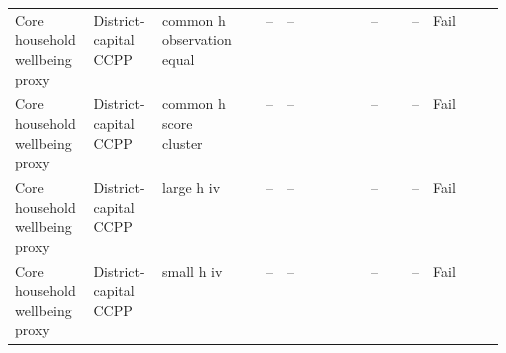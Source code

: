 \begin{longtable}{@{}p{0.16\linewidth}p{0.14\linewidth}p{0.14\linewidth}rp{0.13\linewidth}rrl@{}}
Core household wellbeing proxy & District-capital CCPP & common h observation equal & -- & -- & -- & -- & Fail \\
Core household wellbeing proxy & District-capital CCPP & common h score cluster & -- & -- & -- & -- & Fail \\
Core household wellbeing proxy & District-capital CCPP & large h iv & -- & -- & -- & -- & Fail \\
Core household wellbeing proxy & District-capital CCPP & small h iv & -- & -- & -- & -- & Fail \\
\end{longtable}
\endgroup
